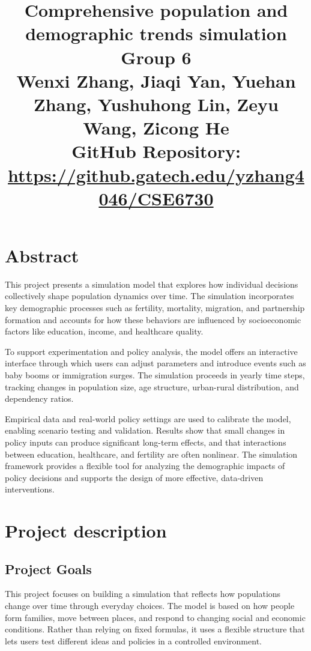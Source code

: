 \documentclass[12pt]{article}
\title{\vspace{2in} 
\textbf{\LARGE Comprehensive population and demographic trends simulation}\\[1cm]
{\small Group 6}\\
{\small Wenxi Zhang, Jiaqi Yan, Yuehan Zhang, Yushuhong Lin, Zeyu Wang, Zicong He}\\[1cm]
{\small GitHub Repository: \url{https://github.gatech.edu/yzhang4046/CSE6730}}
}
\date{}
\begin{document}
\maketitle
\thispagestyle{empty}
\newpage

\section*{Abstract}
This project presents a simulation model that explores how individual decisions collectively shape population dynamics over time. The simulation incorporates key demographic processes such as fertility, mortality, migration, and partnership formation and accounts for how these behaviors are influenced by socioeconomic factors like education, income, and healthcare quality.

To support experimentation and policy analysis, the model offers an interactive interface through which users can adjust parameters and introduce events such as baby booms or immigration surges. The simulation proceeds in yearly time steps, tracking changes in population size, age structure, urban-rural distribution, and dependency ratios.

Empirical data and real-world policy settings are used to calibrate the model, enabling scenario testing and validation. Results show that small changes in policy inputs can produce significant long-term effects, and that interactions between education, healthcare, and fertility are often nonlinear. The simulation framework provides a flexible tool for analyzing the demographic impacts of policy decisions and supports the design of more effective, data-driven interventions.
\newpage
\tableofcontents  %








\newpage

\section{Project description}
\subsection{Project Goals}

This project focuses on building a simulation that reflects how populations change over time through everyday choices. The model is based on how people form families, move between places, and respond to changing social and economic conditions. Rather than relying on fixed formulas, it uses a flexible structure that lets users test different ideas and policies in a controlled environment.
\end{document}

